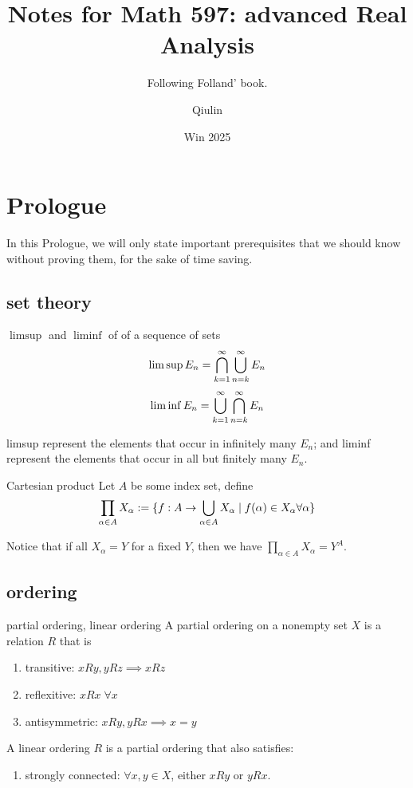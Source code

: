 \documentclass[lang=cn,11pt]{elegantbook}
\title{Notes for Math 597: advanced Real Analysis}
\subtitle{Following Folland' book.\cite{folland1999real}}
\author{Qiulin}
\date{Win 2025}
\begin{document}
\maketitle
\frontmatter
\tableofcontents
\mainmatter


\chapter*{Prologue}
\noindent In this Prologue, we will only state important prerequisites that we should know without proving them, for the sake of time saving.
\section{set theory}
\begin{definition}{$\limsup$ and $\liminf$ of of a sequence of sets}
$$
\limsup E_n = \bigcap_{k=1}^\infty \bigcup_{n=k}^\infty E_n
$$
$$
\liminf E_n = \bigcup_{k=1}^\infty \bigcap_{n=k}^\infty E_n
$$
\end{definition}
limsup represent the elements that occur in infinitely many $E_n$; and liminf represent the elements that occur in all but finitely many $E_n$.


    
\begin{definition}{Cartesian product}
Let $A$ be some index set, define
    $$
    \prod_{\alpha \in A} X_\alpha := \{ f: A\rightarrow \bigcup_{\alpha \in A} X_\alpha \mid f(\alpha) \in X_\alpha \forall \alpha   \}
    $$
\end{definition}
Notice that if all $X_\alpha = Y$ for a fixed $Y$, then we have $\prod_{\alpha \in A} X_\alpha = Y^A$.

\section{ordering}
\begin{definition}{partial ordering, linear ordering}
    A partial ordering on a nonempty set $X$ is a relation $R$ that is 
    \begin{enumerate}
        \item transitive: $xRy, yRz \implies xRz$
        \item reflexitive: $xRx \; \forall x$
        \item antisymmetric: $xRy,yRx \implies x=y$
    \end{enumerate}
    A linear ordering $R$ is a partial ordering that also satisfies:
    \begin{enumerate}[resume]
        \item strongly connected: $\forall x,y \in X$, either $xRy$ or $yRx$.
    \end{enumerate}
\end{definition}
\end{document}
